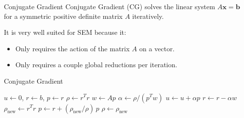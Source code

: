 \begin{frame}{Conjugate Gradient}
    Conjugate Gradient (CG) solves the linear system $A\mathbf{x}=\mathbf{b}$ for a symmetric positive definite matrix $A$ iteratively.

    It is very well suited for SEM because it:
    \begin{itemize}
        \item Only requires the action of the matrix $A$ on a vector.
        \item Only requires a couple global reductions per iteration.
    \end{itemize}
    
\end{frame}

\begin{frame}{Conjugate Gradient}
    \begin{algorithm}[H]
      \caption{Unpreconditioned CG for $A u = b$}
      \begin{algorithmic}[1]
        \State $u \gets 0$, \quad $r \gets b$, \quad $p \gets r$
        \State $\rho \gets r^{T} r$
          \State $w \gets A p$ 
          \State $\alpha \gets \rho / (p^{T} w)$ 
          \State $u \gets u + \alpha p$
          \State $r \gets r - \alpha w$
          \State $\rho_{\text{new}} \gets r^{T} r$ 
          \State $p \gets r + (\rho_{\text{new}} / \rho) \, p$
          \State $\rho \gets \rho_{\text{new}}$
        \EndWhile
      \end{algorithmic}
    \end{algorithm}
\end{frame}
